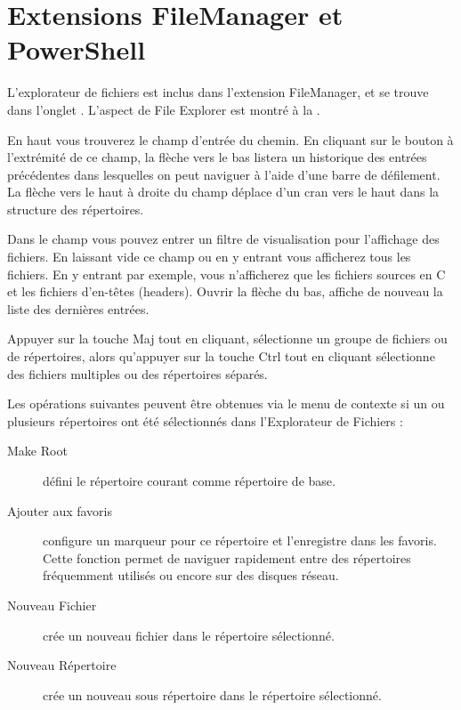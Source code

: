 \section{Extensions FileManager et PowerShell}\label{sec:file_explorer}

L'explorateur de fichiers  est inclus dans l'extension FileManager, et se trouve dans l'onglet  . L'aspect de File Explorer est montré à la .

En haut vous trouverez le champ d'entrée du chemin. En cliquant sur le bouton à l'extrémité de ce champ, la flèche vers le bas listera un historique des entrées précédentes dans lesquelles on peut naviguer à l'aide d'une barre de défilement. La flèche vers le haut à droite du champ déplace d'un cran vers le haut dans la structure des répertoires.

Dans le champ  vous pouvez entrer un filtre de visualisation pour l'affichage des fichiers. En laissant vide ce champ ou en y entrant \codeline{*} vous afficherez tous les fichiers. En y entrant  par exemple, vous n'afficherez que les fichiers sources en C et les fichiers d'en-têtes (headers). Ouvrir la flèche du bas, affiche de nouveau la liste des dernières entrées.


Appuyer sur la touche Maj tout en cliquant, sélectionne un groupe de fichiers ou de répertoires, alors qu'appuyer sur la touche Ctrl tout en cliquant sélectionne des fichiers multiples ou des répertoires séparés.

Les opérations suivantes peuvent être obtenues via le menu de contexte si un ou plusieurs répertoires ont été sélectionnés dans l'Explorateur de Fichiers :

\begin{description}
\item[Make Root] défini le répertoire courant comme répertoire de base.
\item[Ajouter aux favoris] configure un marqueur pour ce répertoire et l'enregistre dans les favoris. Cette fonction permet de naviguer rapidement entre des répertoires fréquemment utilisés ou encore sur des disques réseau.
\item[Nouveau Fichier] crée un nouveau fichier dans le répertoire sélectionné.
\item[Nouveau Répertoire] crée un nouveau sous répertoire dans le répertoire sélectionné.
\end{description}

